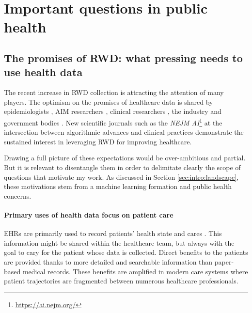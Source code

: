 \documentclass[french,12pt,twoside,a4paper]{book}
\begin{document}


\section{Important questions in public health}%
\label{sec:intro:causality}%

\subsection{The promises of RWD: what pressing needs to use health data}

The recent increase in RWD collection is attracting the attention of many
players. The optimism on the promises of healthcare data is shared by
epidemiologists \citep{mooney2015epidemiology,hernan_using_2016}, AIM researchers
\citep{schwartz1987artificial, yu2018artificial}, clinical researchers
\citep{schwalbe2020artificial,dzau2023anticipating}, the industry
\citep{pfizer2019rwd,iqvia2023rwd} and government bodies
\citep{mcginnis2013best,fda_real_2018,ema2023rwd}. New scientific journals such
as the \emph{NEJM AI}\footnote{\url{https://ai.nejm.org/}} \citep{beam_2023} at
the intersection between algorithmic advances and clinical practices
demonstrate the sustained interest in leveraging RWD for improving healthcare.

Drawing a full picture of these expectations would be over-ambitious and
partial. But it is relevant to disentangle them in order to delimitate
clearly the scope of questions that motivate my work. As discussed in Section
\ref{sec:intro:landscape}, these motivations stem from a machine learning
formation and public health concerns.

\paragraph{Primary uses of health data focus on patient care}

EHRs are primarily used to record patients' health state and cares
\citep{safran_toward_2007,eu_primary_2022}. This information might be shared
within the healthcare team, but always with the goal to cary for the patient
whose data is collected. Direct benefits to the patients are provided thanks to
more detailed and searchable information than paper-based medical records. These
benefits are amplified in modern care systems where patient trajectories are
fragmented between numerous healthcare professionals.
\end{document}
